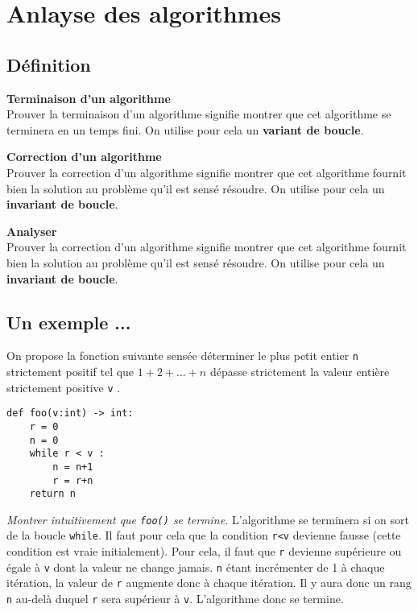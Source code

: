 \section{Anlayse des algorithmes}

\subsection{Définition}

\begin{defi}\textbf{Terminaison d'un algorithme} \\
Prouver la terminaison d'un algorithme signifie montrer que cet algorithme se terminera en un temps fini. On utilise pour cela un \textbf{variant de boucle}.
\end{defi}

\begin{defi}\textbf{Correction d'un algorithme} \\
Prouver la correction d'un algorithme signifie montrer que cet algorithme fournit bien la solution au problème qu'il est sensé résoudre. On utilise pour cela un \textbf{invariant de boucle}.
\end{defi}

\begin{defi}\textbf{Analyser} \\
Prouver la correction d'un algorithme signifie montrer que cet algorithme fournit bien la solution au problème qu'il est sensé résoudre. On utilise pour cela un \textbf{invariant de boucle}.
\end{defi}


\subsection{Un exemple ...}
On propose la fonction suivante sensée déterminer le plus petit entier \texttt{n} strictement positif tel que $1 + 2 + . . . + n$ dépasse strictement la valeur entière strictement positive \texttt{v} .

\begin{lstlisting}
def foo(v:int) -> int:
    r = 0
    n = 0
    while r < v : 
        n = n+1
        r = r+n
    return n
\end{lstlisting}

\textit{Montrer intuitivement que \texttt{foo()} se termine.}
L'algorithme se terminera si on sort de la boucle \texttt{while}. Il faut pour cela que la condition \texttt{r<v} devienne fausse (cette condition est vraie initialement). Pour cela, il faut que \texttt{r} devienne supérieure ou égale à \texttt{v} dont la valeur ne change jamais. 
\texttt{n} étant incrémenter de 1 à chaque itération, la valeur de \texttt{r} augmente donc à chaque itération. Il y aura donc un rang \texttt{n} au-delà duquel \texttt{r} sera supérieur à \texttt{v}. L'algorithme donc se termine. 

